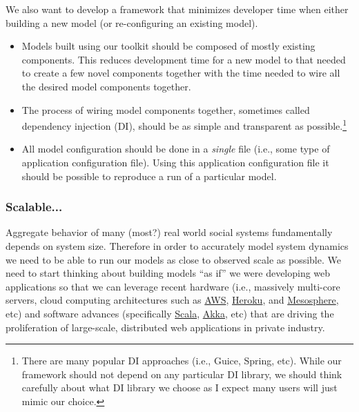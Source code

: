 \documentclass[11pt]{amsart}
\begin{document}
We also want to develop a framework that minimizes developer time when either building a new model (or re-configuring an existing model).
\begin{itemize}
    \item Models built using our toolkit should be composed of mostly existing components. This reduces development time for a new model to that needed to create a few novel components together with the time needed to wire all the desired model components together.
    \item The process of wiring model components together, sometimes called dependency injection (DI), should be as simple and transparent as possible.\footnote{
    There are many popular DI approaches (i.e., Guice, Spring, etc). While our framework should not depend on any particular DI library, we should think carefully about what DI library we choose as I expect many users will just mimic our choice.
    }
    \item All model configuration should be done in a \textit{single} file (i.e., some type of application configuration file).  Using this application configuration file it should be possible to reproduce a run of a particular model.
\end{itemize}

\subsubsection{Scalable...}
Aggregate behavior of many (most?) real world social systems fundamentally depends on system size. Therefore in order to accurately model system dynamics we need to be able to run our models as close to observed scale as possible. We need to start thinking about building models ``as if'' we were developing web applications so that we can leverage recent hardware (i.e., massively multi-core servers, cloud computing architectures such as \href{http://aws.amazon.com/}{AWS}, \href{https://www.heroku.com/}{Heroku}, and \href{https://mesosphere.com/}{Mesosphere}, etc) and software advances (specifically \href{http://www.scala-lang.org/}{Scala}, \href{http://akka.io/}{Akka}, etc) that are driving the proliferation of large-scale, distributed web applications in private industry.
\end{document}
